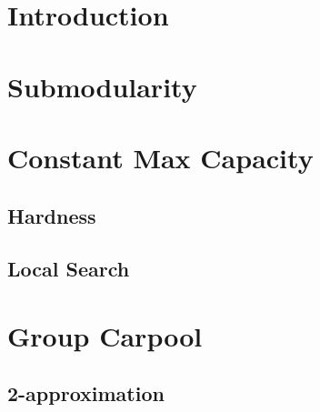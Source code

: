 \begin{abstract}

\end{abstract}

\section{Introduction}


\section{Submodularity}
\label{sec:sub}


\section{Constant Max Capacity}

	\subsection{Hardness}
	\label{sec:hardness}
	

	\subsection{Local Search}
	\label{sec:local}
	

\section{Group Carpool}
\label{sec:group}


\subsection{2-approximation}

